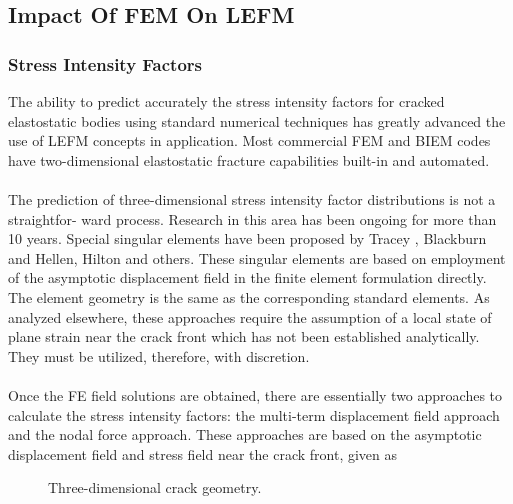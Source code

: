 \documentclass[11pt]{article}
\begin{document}
\subsection{Impact Of FEM On LEFM}
\subsubsection{Stress Intensity Factors}
The ability to predict accurately the stress intensity factors for cracked elastostatic bodies using
standard numerical techniques has greatly advanced the use of LEFM concepts in application.
Most commercial
FEM and BIEM codes have two-dimensional elastostatic fracture capabilities built-in and
automated.
\\\\
The prediction of three-dimensional stress intensity factor distributions is not a straightfor-
ward process. Research in this area has been ongoing for more than 10 years. Special singular
elements have been proposed by Tracey , Blackburn and Hellen, Hilton and others. These
singular elements are based on employment of the asymptotic displacement field in the finite
element formulation directly. The element geometry is the same as the corresponding standard
elements. As analyzed elsewhere, these approaches require the assumption of a local state
of plane strain near the crack front which has not been established analytically. They must be
utilized, therefore, with discretion.
\\\\
Once the FE field solutions are obtained, there are essentially two approaches to calculate the
stress intensity factors: the multi-term displacement field approach and the nodal force
approach. These approaches are based on the asymptotic displacement field and stress field
near the crack front, given as
\begin{figure}[H]
    \centering
    \captionsetup{labelformat=empty}
    \caption{Three-dimensional crack geometry.}  
\end{figure}
\end{document}

